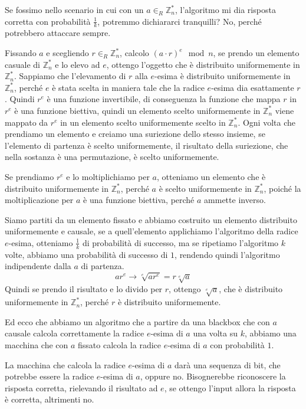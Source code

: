 Se fossimo nello scenario in cui con un $a\in_R \mathbb{Z}_n^*$, l'algoritmo 
mi dia risposta corretta con probabilità $\frac{1}{k}$, potremmo dichiararci 
tranquilli? No, perché potrebbero attaccare sempre.

Fissando $a$ e scegliendo $r \in_R \mathbb{Z}_n^*$, calcolo $(a\cdot r)^e \mod n$,
se prendo un elemento casuale di $\mathbb{Z}_n^*$ e lo elevo ad $e$, ottengo
l'oggetto che è distribuito uniformemente in $\mathbb{Z}_n^*$. Sappiamo che
l'elevamento di $r$ alla $e$-esima è distribuito uniformemente in $\mathbb{Z}_n^*$, 
perché $e$ è stata scelta in maniera tale che la radice $e$-esima dia esattamente 
$r$. Quindi $r^e$ è una funzione invertibile, di conseguenza la funzione che mappa $r$ in 
$r^e$ è una funzione biettiva, quindi un elemento scelto uniformemente in $\mathbb{Z}_n^*$
viene mappato da $r^e$ in un elemento scelto uniformemente scelto in $\mathbb{Z}_n^*$.
Ogni volta che prendiamo un elemento e creiamo una suriezione dello stesso insieme, 
se l'elemento di partenza è scelto uniformemente, il risultato della suriezione, che nella 
sostanza è una permutazione, è scelto uniformemente.

Se prendiamo $r^e$ e lo moltiplichiamo per $a$, otteniamo un elemento che è distribuito
uniformemente in $\mathbb{Z}_n^*$, perché $a$ è scelto uniformemente in $\mathbb{Z}_n^*$, 
poiché la moltiplicazione per $a$ è una funzione biettiva, perché $a$ ammette inverso.

Siamo partiti da un elemento fissato e abbiamo costruito un elemento distribuito uniformemente
e causale, se a quell'elemento applichiamo l'algoritmo della radice $e$-esima, otteniamo
$\frac{1}{k}$ di probabilità di successo, ma se ripetiamo l'algoritmo $k$ volte, abbiamo
una probabilità di successo di $1$, rendendo quindi l'algoritmo indipendente dalla $a$ di 
partenza.
\[
  ar^e \rightarrow \sqrt[e]{ar^e} = r \sqrt[e]{a}
\]
Quindi se prendo il risultato e lo divido per $r$, ottengo $\sqrt[e]{a}$,
che è distribuito uniformemente in $\mathbb{Z}_n^*$, perché $r$ è distribuito uniformemente.

Ed ecco che abbiamo un algoritmo che a partire da una blackbox che con $a$ causale 
calcola correttamente la radice $e$-esima di $a$ una volta su $k$, abbiamo una macchina 
che con $a$ fissato calcola la radice $e$-esima di $a$ con probabilità $1$.

La macchina che calcola la radice $e$-esima di $a$ darà una sequenza di bit, che
potrebbe essere la radice $e$-esima di $a$, oppure no. Bisognerebbe riconoscere la risposta
corretta, rielevando il risultato ad $e$, se ottengo l'input allora la risposta è 
corretta, altrimenti no.

